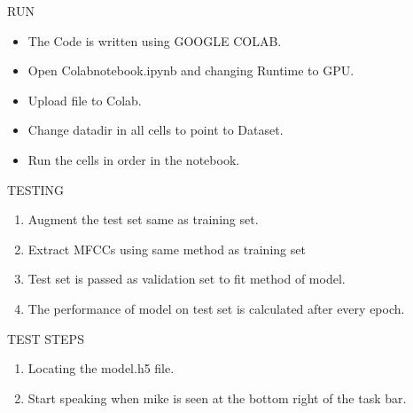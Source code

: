 \documentclass[11pt]{beamer}
\begin{document}
\begin{frame}
{RUN}
\begin{itemize}
    \item The Code is written using GOOGLE COLAB.
    \item Open Colabnotebook.ipynb and changing Runtime to GPU.
    \item Upload file to Colab.
    \item Change datadir in all cells to point to Dataset.
    \item Run the cells in order in the notebook.
\end{itemize}
\end{frame}



\begin{frame}
{TESTING}
\begin{enumerate}
    \item Augment the test set same as training set.
    \item Extract MFCCs using same method as training set
    \item Test set is passed as validation set to fit method of model.
    \item The performance of model on test set is calculated after every epoch.
\end{enumerate}

\end{frame}



\begin{frame}
{TEST STEPS}
\begin{enumerate}
    \item Locating the model.h5 file.
    \item Start speaking when mike is seen at the bottom right of the task bar.
    
\end{enumerate}
    
\end{frame}
\end{document}
